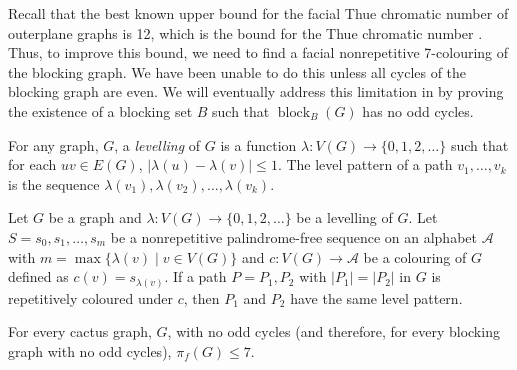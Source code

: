 \documentclass{patmorin}
\DeclareMathOperator{\block}{block}
\begin{document}
Recall that the best known upper bound for the facial Thue chromatic
number of outerplane graphs is 12, which is the bound for the Thue
chromatic number \cite{barat2007square, kundgen2008nonrepetitive}. Thus,
to improve this bound, we need to find a facial nonrepetitive 7-colouring
of the blocking graph. We have been unable to do this unless all cycles of
the blocking graph are even.  We will eventually address this limitation
in  by proving the existence of a blocking
set $B$ such that $\block_B(G)$ has no odd cycles.

For any graph, $G$, a \emph{levelling} of $G$ is a function
$\lambda\colon V(G)\to \{0, 1, 2,\dots\}$ such that for each
$uv\in E(G)$, $|\lambda(u)-\lambda(v)|\leq 1$. The
level pattern of a path $v_1,\ldots,v_k$ is the sequence
$\lambda(v_1),\lambda(v_2),\ldots,\lambda(v_k)$.

\begin{lem} 
 Let $G$ be a graph and $\lambda\colon V(G)\to \{0, 1,
 2,\dots\}$ be a levelling of $G$. Let $S=s_0,s_1,\ldots,s_m$
 be a nonrepetitive palindrome-free sequence on an alphabet
 $\mathcal{A}$ with $m=\max\{\lambda(v) \;|\; v \in V(G)\}$ and
 $c : V(G) \rightarrow \mathcal{A}$ be a colouring of $G$ defined
 as $c(v)=s_{\lambda(v)}$. If a path $P=P_1, P_2$ with
 $|P_1|=|P_2|$ in $G$ is repetitively coloured under $c$, then $P_1$
 and $P_2$ have the same level pattern.
\end{lem}

\begin{lem}
  For every cactus graph, $G$, with no odd cycles (and therefore, for
  every blocking graph with no odd cycles), $\pi_f(G)\le 7$.
\end{lem}
\end{document}
